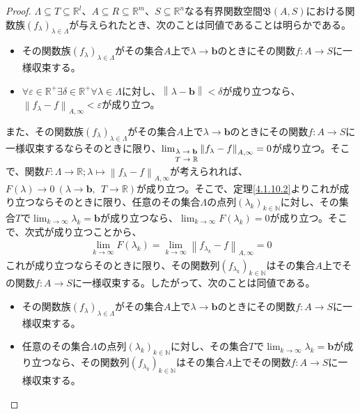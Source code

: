 \documentclass[dvipdfmx]{jsarticle}
\begin{document}
\begin{proof}
$\varLambda \subseteq T \subseteq \mathbb{R}^{l}$、$A \subseteq R \subseteq \mathbb{R}^{m}$、$S \subseteq \mathbb{R}^{n}$なる有界関数空間$\mathfrak{B}(A,S)$における関数族$\left( f_{\lambda} \right)_{\lambda \in \varLambda}$が与えられたとき、次のことは同値であることは明らかである。
\begin{itemize}
\item
  その関数族$\left( f_{\lambda} \right)_{\lambda \in \varLambda}$がその集合$A$上で$\lambda \rightarrow \mathbf{b}$のときにその関数$f:A \rightarrow S$に一様収束する。
\item
  $\forall\varepsilon \in \mathbb{R}^{+}\exists\delta \in \mathbb{R}^{+}\forall\lambda \in \varLambda$に対し、$\left\| \lambda - \mathbf{b} \right\| < \delta$が成り立つなら、$\left\| f_{\lambda} - f \right\|_{A,\infty} < \varepsilon$が成り立つ。
\end{itemize}\par
また、その関数族$\left( f_{\lambda} \right)_{\lambda \in \varLambda}$がその集合$A$上で$\lambda \rightarrow \mathbf{b}$のときにその関数$f:A \rightarrow S$に一様収束するならそのときに限り、$\lim_{\scriptsize \begin{matrix} \lambda \rightarrow \mathbf{b} \\ T \rightarrow \mathbb{R} \end{matrix}}\left\| f_{\lambda} - f \right\|_{A,\infty} = 0$が成り立つ。そこで、関数$F:\varLambda \rightarrow \mathbb{R};\lambda \mapsto \left\| f_{\lambda} - f \right\|_{A,\infty}$が考えられれば、$F(\lambda) \rightarrow 0\ \left( \lambda \rightarrow \mathbf{b},\ \ T \rightarrow \mathbb{R} \right)$が成り立つ。そこで、定理\ref{4.1.10.2}よりこれが成り立つならそのときに限り、任意のその集合$\varLambda$の点列$\left( \lambda_{k} \right)_{k \in \mathbb{N}}$に対し、その集合$T$で$\lim_{k \rightarrow \infty}\lambda_{k} = \mathbf{b}$が成り立つなら、$\lim_{k \rightarrow \infty}{F\left( \lambda_{k} \right)} = 0$が成り立つ。そこで、次式が成り立つことから、
\begin{align*}
\lim_{k \rightarrow \infty}{F\left( \lambda_{k} \right)} = \lim_{k \rightarrow \infty}\left\| f_{\lambda_{k}} - f \right\|_{A,\infty} = 0
\end{align*}
これが成り立つならそのときに限り、その関数列$\left( f_{\lambda_{k}} \right)_{k \in \mathbb{N}}$はその集合$A$上でその関数$f:A \rightarrow S$に一様収束する。したがって、次のことは同値である。
\begin{itemize}
\item
  その関数族$\left( f_{\lambda} \right)_{\lambda \in \varLambda}$がその集合$A$上で$\lambda \rightarrow \mathbf{b}$のときにその関数$f:A \rightarrow S$に一様収束する。
\item
  任意のその集合$\varLambda$の点列$\left( \lambda_{k} \right)_{k \in \mathbb{N}}$に対し、その集合$T$で$\lim_{k \rightarrow \infty}\lambda_{k} = \mathbf{b}$が成り立つなら、その関数列$\left( f_{\lambda_{k}} \right)_{k \in \mathbb{N}}$はその集合$A$上でその関数$f:A \rightarrow S$に一様収束する。
\end{itemize}
\end{proof}
\end{document}
